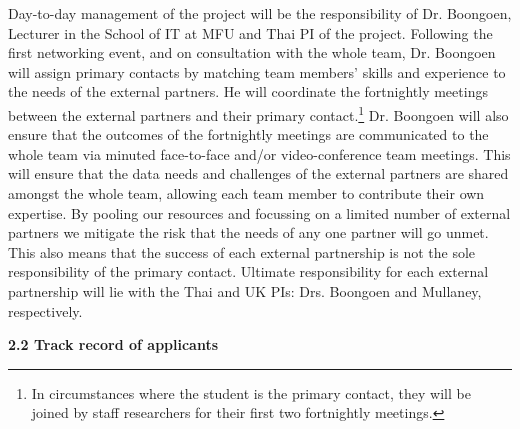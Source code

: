 \documentclass[11pt]{article}
\begin{document}
\vspace{2mm}
\noindent
Day-to-day management of the project will be the responsibility of Dr. Boongoen, Lecturer in the School of IT at MFU and Thai PI of the project. Following the first networking event, and on consultation with the whole team, Dr. Boongoen will assign primary contacts by matching team members' skills and experience to the needs of the external partners. He will coordinate the fortnightly meetings between the external partners and their primary contact.\footnote{In circumstances where the student is the primary contact, they will be joined by staff researchers for their first two fortnightly meetings.} Dr. Boongoen will also ensure that the outcomes of the fortnightly meetings are communicated to the whole team via minuted face-to-face and/or video-conference team meetings. This will ensure that the data needs and challenges of the external partners are shared amongst the whole team, allowing each team member to contribute their own expertise. By pooling our resources and focussing on a limited number of external partners we mitigate the risk that the needs of any one partner will go unmet. This also means that the success of each external partnership is not the sole responsibility of the primary contact. Ultimate responsibility for each external partnership will lie with the Thai and UK PIs: Drs. Boongoen and Mullaney, respectively. 

\vspace{3mm}
\noindent
{\large \bf 2.2 Track record of applicants}
\end{document}
